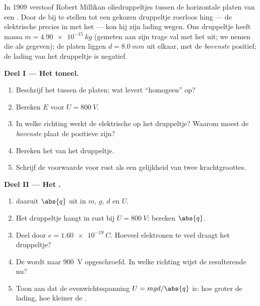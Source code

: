 \begin{problem}
\label{pb:g11:electric-gravitational-fields:1}
In 1909 verstoof Robert Millikan oliedruppeltjes tussen de horizontale
platen van een . Door de  bij te stellen tot een
gekozen druppeltje roerloos hing --- de elektrische  precies in
 met het  --- kon hij zijn lading wegen. Ons druppeltje
heeft massa $m = \qty{4.90e-15}{kg}$ (gemeten aan zijn trage val met het
 uit; we nemen die als gegeven); de platen liggen $d = \qty{8.0}{mm}$
uit elkaar, met de \emph{bovenste} positief; de lading van het druppeltje
is negatief.

\medskip
\noindent\textbf{Deel I --- Het toneel.}
\begin{enumerate}
  \item Beschrijf het  tussen de platen; wat levert ``homogeen'' op?
  \item Bereken $E$ voor $U = \qty{800}{V}$.
  \item In welke richting werkt de elektrische  op het druppeltje?
        Waarom moest de \emph{bovenste} plaat de positieve zijn?
  \item Bereken het  van het druppeltje.
  \item Schrijf de voorwaarde voor rust als een gelijkheid van twee
        krachtgroottes.
\end{enumerate}

\medskip
\noindent\textbf{Deel II --- Het .}
\begin{enumerate}[resume]
  \item {} daaruit $\abs{q}$ uit in $m$, $g$, $d$ en $U$.
  \item Het druppeltje hangt in rust bij $U = \qty{800}{V}$: bereken
        $\abs{q}$.
  \item Deel door $e = \qty{1.60e-19}{C}$. Hoeveel elektronen te veel
        draagt het druppeltje?
  \item De  wordt naar \qty{900}{V} opgeschroefd. In welke
        richting wijst de resulterende  nu?
  \item Toon aan dat de evenwichtsspanning $U = mgd/\abs{q}$ is: hoe
        groter de lading, hoe kleiner de .
\end{enumerate}


\end{problem}
